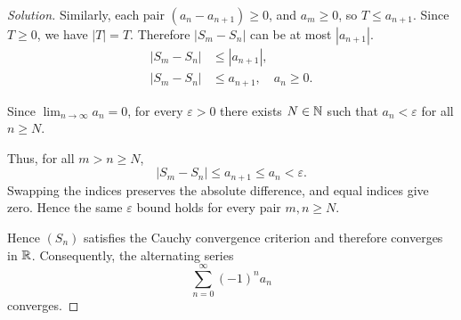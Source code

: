 \begin{proof}[Solution]
  Similarly, each pair $(a_n-a_{n+1})\ge0$, and
  $a_m\ge0$, so $T\le a_{n+1}$. Since $T\ge0$, we have $|T|=T$.
  Therefore $|S_m-S_n|$ can be at most $|a_{n+1}|$.
  \begin{align*}
    |S_m-S_n|&\le|a_{n+1}|,\\
    |S_m-S_n|&\le a_{n+1},\quad a_n\ge0.
  \end{align*}

  Since $\lim_{n\to\infty}a_n=0$, for every
  $\varepsilon>0$ there exists $N\in\mathbb{N}$
  such that $a_n<\varepsilon$ for all $n\ge N$.

  Thus, for all $m>n\ge N$,
  \[
    |S_m-S_n|\le a_{n+1}\le a_n<\varepsilon.
  \]
  Swapping the indices preserves the absolute
  difference, and equal indices give zero. Hence the same
  $\varepsilon$ bound holds for every pair $m,n\ge N$.

  Hence $(S_n)$ satisfies the Cauchy convergence
  criterion and therefore converges in $\mathbb{R}$.
  Consequently, the alternating series
  \[
    \sum_{n=0}^{\infty}(-1)^n a_n
  \]
  converges.
\end{proof}

